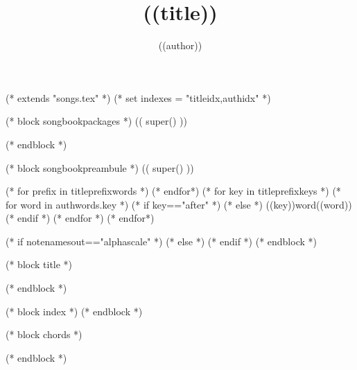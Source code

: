 (* extends "songs.tex" *)
(* set indexes = "titleidx,authidx" *)

(* block songbookpackages *)
   (( super() ))

  \usepackage{chords}
(* endblock *)

(* block songbookpreambule *)
   (( super() ))

   \title{((title))}
   \author{((author))}


   (* for prefix in titleprefixwords *)
   (* endfor*)
   (* for key in titleprefixkeys *)
      (* for word in authwords.key *)
      (* if key=="after" *)
      (* else *)
      \auth((key))word{((word))}
      (* endif *)
      (* endfor *)
   (* endfor*)
   
   (* if notenamesout=="alphascale" *)
    (* else *)
   (* endif *)
(* endblock *)

(* block title *)
\maketitle
(* endblock *)

(* block index *)
(* endblock *)

(* block chords *)
   \ifchorded
   \chords
   \fi
(* endblock *)

